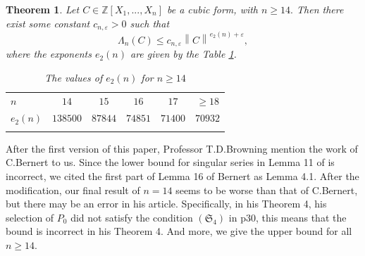\documentclass[12pt]{amsart}
\newtheorem{theorem}{Theorem}[section]
\theoremstyle{definition}
\numberwithin{equation}{section}
\begin{document}
\begin{theorem}
    

    

    \label{theorem_normal}
    Let $C \in \mathbb{Z}[X_1,...,X_n]$ be a cubic form, with $n \geq 14.$ Then there exist some constant $c_{n, \varepsilon} >0$ such that
    \begin{equation*}
        \Lambda_n(C) \leq c_{n, \varepsilon} \left\| C\right\|^{e_2(n)+\varepsilon},
    \end{equation*}
    where the exponents $e_2(n)$ are given by the Table \ref{tab1}.
    
    \begin{table}[htbp]%
        \begin{center}
        \caption{The values of $e_2(n)$ for $n \geq 14$}\label{tab1}\vspace{-2mm}
        \end{center}
  
    	\centering
    	\begin{tabular}{l|c|c|c|c|c|}
    		\hline\hline\noalign{\smallskip}	
    		$n$ & $14$ & $15$ & $16$ & $17$ & $\geq 18$\\
    		\noalign{\smallskip}\hline\noalign{\smallskip}
    		$e_2(n)$ & $138500$ & $87844$ & $74851$ & $71400$ & $70932$\\ 
    		\noalign{\smallskip}\hline
    	\end{tabular}
    \end{table}
    
\end{theorem}

After the first version of this paper, Professor T.D.Browning mention the work \cite{bernert2023} of C.Bernert to us. Since the lower bound for singular series in Lemma 11 of \cite{browning2009least} is incorrect, we cited the first part of Lemma 16 of Bernert as  Lemma 4.1. After the modification, our final result of $n =14$ seems to be worse than that of C.Bernert, but there may be an error in his article. Specifically, in his Theorem 4, his selection of $P_0 $ did not satisfy the condition $(\mathfrak {S}_4)$ in p30, this means that the bound is incorrect in his Theorem 4. And more, we give the upper bound for all
$n\geq 14$.
\end{document}

